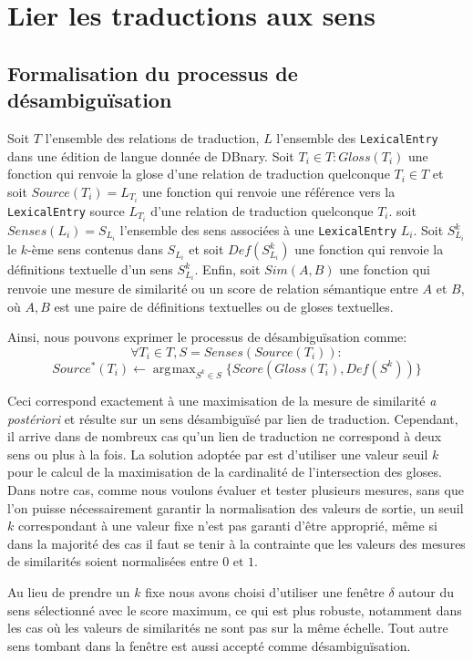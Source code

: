 \documentclass[10pt,a4paper,twoside]{article}
\DeclareMathOperator*{\argmax}{arg\!\max}
\begin{document}
\section{Lier les traductions aux sens}
\subsection{Formalisation du processus de désambiguïsation}
Soit \(T\) l'ensemble des relations de traduction, \(L\) l'ensemble des \verb|LexicalEntry| dans une édition de langue donnée de DBnary. Soit \(T_i\in T: Gloss(T_i)\) une fonction qui renvoie la glose d'une relation de traduction quelconque \(T_i\in T\) et soit \(Source(T_i)=L_{T_i}\) une fonction qui renvoie une référence vers la \verb|LexicalEntry| source \(L_{T_i}\) d'une relation de traduction quelconque \(T_i\). soit \(Senses(L_i)=S_{L_i}\) l'ensemble des sens associées à une  \verb|LexicalEntry| \(L_i\). Soit \(S_{L_i}^k\) le \(k\)-ème sens contenus dans \(S_{L_i}\) et soit \(Def(S_{L_i}^k)\) une fonction qui renvoie la définitions textuelle d'un sens  \(S_{L_i}^k\). Enfin, soit \(Sim(A,B)\) une fonction qui renvoie  une mesure de similarité ou un score de relation sémantique  entre \(A\) et \(B\), où \(A,B\) est une paire de définitions textuelles ou de gloses textuelles. 

Ainsi, nous pouvons exprimer le processus de désambiguïsation comme:
\[
\forall T_i \in T, S=Senses(Source(T_i)): 
\]
\[
Source^*(T_i) \leftarrow  \argmax_{S^k\in S} \{Score(Gloss(T_i),Def(S^k))\}
\]

Ceci correspond exactement à une maximisation de la mesure de similarité \emph{a postériori} et résulte sur un sens désambiguïsé par lien de traduction. Cependant, il arrive dans de nombreux cas qu'un lien de traduction ne correspond à deux sens ou plus à la fois. La solution adoptée par \cite{MeyerGurevych:oup2012} est d'utiliser une valeur seuil \(k\) pour le calcul de la maximisation de la cardinalité de l'intersection des gloses. Dans notre cas, comme nous voulons évaluer et tester plusieurs mesures, sans que l'on puisse nécessairement garantir la normalisation des valeurs de sortie, un seuil \(k\) correspondant à une valeur fixe n'est pas garanti d'être approprié, même si dans la majorité des cas il faut se tenir à la contrainte que les valeurs des mesures de similarités soient normalisées entre  \(0 \mbox{ et  } 1\).

Au lieu de prendre un \(k\) fixe nous avons choisi d'utiliser une fenêtre \(\delta\) autour du sens sélectionné avec le score maximum, ce qui est plus robuste, notamment dans les cas où les valeurs de similarités ne sont pas sur la même échelle. Tout autre sens tombant dans la fenêtre est aussi accepté comme désambiguïsation.  
\end{document}
